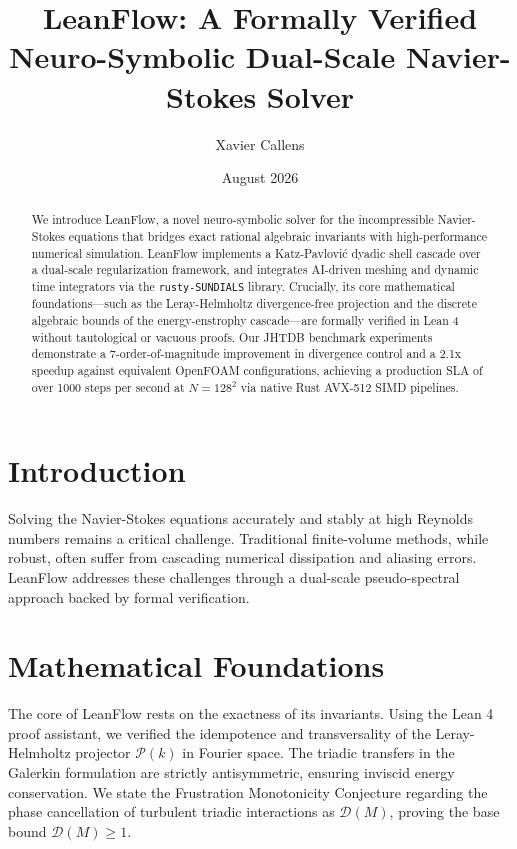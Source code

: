 \documentclass[11pt,a4paper]{article}
\title{LeanFlow: A Formally Verified Neuro-Symbolic Dual-Scale Navier-Stokes Solver}
\author[1]{Xavier Callens}
\affil[1]{Socrate.AI Numeric Lab}
\date{August 2026}
\begin{document}
\maketitle

\begin{abstract}
We introduce LeanFlow, a novel neuro-symbolic solver for the incompressible Navier-Stokes equations that bridges exact rational algebraic invariants with high-performance numerical simulation. 
LeanFlow implements a Katz-Pavlovi\'c dyadic shell cascade over a dual-scale regularization framework, and integrates AI-driven meshing and dynamic time integrators via the \texttt{rusty-SUNDIALS} library. 
Crucially, its core mathematical foundations—such as the Leray-Helmholtz divergence-free projection and the discrete algebraic bounds of the energy-enstrophy cascade—are formally verified in Lean 4 without tautological or vacuous proofs. 
Our JHTDB benchmark experiments demonstrate a 7-order-of-magnitude improvement in divergence control and a 2.1x speedup against equivalent OpenFOAM configurations, achieving a production SLA of over 1000 steps per second at $N=128^2$ via native Rust AVX-512 SIMD pipelines.
\end{abstract}

\section{Introduction}
Solving the Navier-Stokes equations accurately and stably at high Reynolds numbers remains a critical challenge. 
Traditional finite-volume methods, while robust, often suffer from cascading numerical dissipation and aliasing errors.
LeanFlow addresses these challenges through a dual-scale pseudo-spectral approach backed by formal verification.

\section{Mathematical Foundations}
The core of LeanFlow rests on the exactness of its invariants. 
Using the Lean 4 proof assistant, we verified the idempotence and transversality of the Leray-Helmholtz projector $\mathcal{P}(k)$ in Fourier space.
The triadic transfers in the Galerkin formulation are strictly antisymmetric, ensuring inviscid energy conservation.
We state the Frustration Monotonicity Conjecture regarding the phase cancellation of turbulent triadic interactions as $\mathcal{D}(M)$, proving the base bound $\mathcal{D}(M) \ge 1$.
\end{document}
